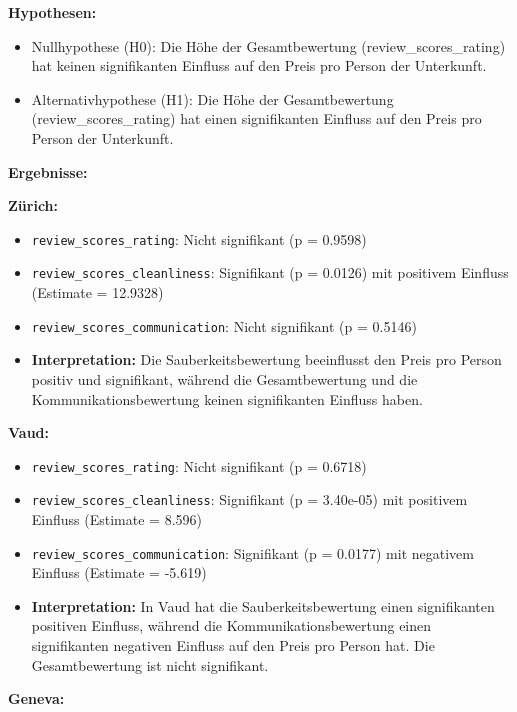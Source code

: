 \documentclass[
  journal,
]{IEEEtran}%
\providecommand{\tightlist}{%
  \setlength{\itemsep}{0pt}\setlength{\parskip}{0pt}}\usepackage{longtable,booktabs,array}
\begin{document}
\textbf{Hypothesen:}

\begin{itemize}
\tightlist
\item
  Nullhypothese (H0): Die Höhe der Gesamtbewertung
  (review\_scores\_rating) hat keinen signifikanten Einfluss auf den
  Preis pro Person der Unterkunft.
\item
  Alternativhypothese (H1): Die Höhe der Gesamtbewertung
  (review\_scores\_rating) hat einen signifikanten Einfluss auf den
  Preis pro Person der Unterkunft.
\end{itemize}

\textbf{Ergebnisse:}

\textbf{Zürich:}

\begin{itemize}
\item
  \texttt{review\_scores\_rating}: Nicht signifikant (p = 0.9598)
\item
  \texttt{review\_scores\_cleanliness}: Signifikant (p = 0.0126) mit
  positivem Einfluss (Estimate = 12.9328)
\item
  \texttt{review\_scores\_communication}: Nicht signifikant (p = 0.5146)
\item
  \textbf{Interpretation:} Die Sauberkeitsbewertung beeinflusst den
  Preis pro Person positiv und signifikant, während die Gesamtbewertung
  und die Kommunikationsbewertung keinen signifikanten Einfluss haben.
\end{itemize}

\textbf{Vaud:}

\begin{itemize}
\item
  \texttt{review\_scores\_rating}: Nicht signifikant (p = 0.6718)
\item
  \texttt{review\_scores\_cleanliness}: Signifikant (p = 3.40e-05) mit
  positivem Einfluss (Estimate = 8.596)
\item
  \texttt{review\_scores\_communication}: Signifikant (p = 0.0177) mit
  negativem Einfluss (Estimate = -5.619)
\item
  \textbf{Interpretation:} In Vaud hat die Sauberkeitsbewertung einen
  signifikanten positiven Einfluss, während die Kommunikationsbewertung
  einen signifikanten negativen Einfluss auf den Preis pro Person hat.
  Die Gesamtbewertung ist nicht signifikant.
\end{itemize}

\textbf{Geneva:}
\end{document}

